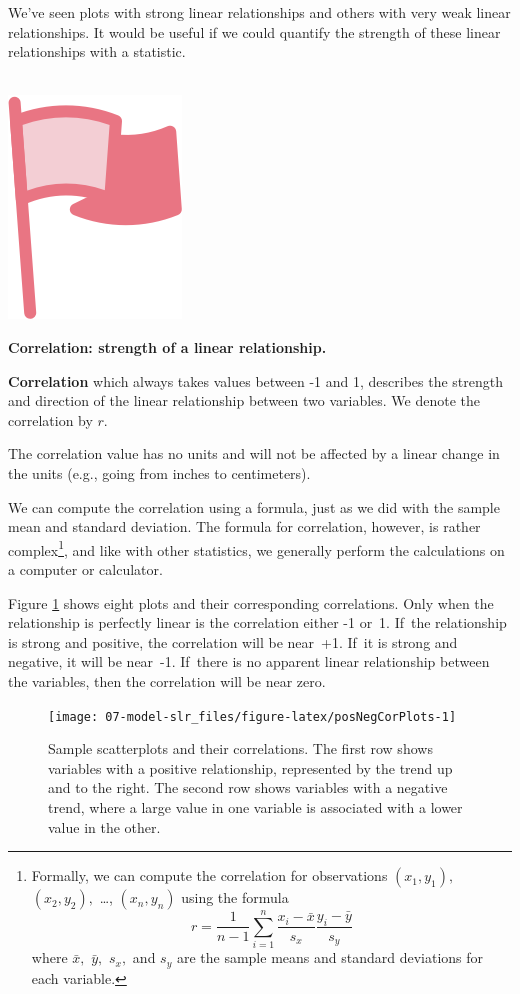 \documentclass[
  10pt,
  openany]{book}
\newenvironment{mdframedwithfootImportant}
{   
    \savenotes
    \begin{mdframed}[%
    topline=true, bottomline=true, linecolor=oiR, linewidth=0.5pt,
    rightline=false, leftline=false,
    backgroundcolor=oiLGray]
    \renewcommand{\thempfootnote}{\arabic{footnote}}
    }
{
    \end{mdframed}
    \spewnotes
}
\newenvironment{important}{
    \let\oldtextbf\textbf
    \renewcommand{\textbf}[1]{{\textcolor{oiR}{\oldtextbf{##1}}}}
\vspace{4mm}
\begin{mdframedwithfootImportant}
\begin{minipage}[t]{0.10\textwidth}
{$\:$ \\ \setkeys{Gin}{width=2.5em,keepaspectratio}\includegraphics{images/_icons/important.png}}
\end{minipage}
\hfill
\begin{minipage}[t]{0.90\textwidth}
\vspace{-2mm}
\setlength{\parskip}{1em}
}{\end{minipage}
\end{mdframedwithfootImportant}
\vspace{4mm}
}
\begin{document}
We've seen plots with strong linear relationships and others with very weak linear relationships.
It would be useful if we could quantify the strength of these linear relationships with a statistic.

\begin{important}
\textbf{Correlation: strength of a linear relationship.}

\textbf{Correlation} which always takes values between -1 and 1, describes the strength and direction of the linear relationship between two variables.
We denote the correlation by \(r.\)

The correlation value has no units and will not be affected by a linear change in the units (e.g., going from inches to centimeters).

\end{important}

We can compute the correlation using a formula, just as we did with the sample mean and standard deviation.
The formula for correlation, however, is rather complex\footnote{Formally, we can compute the correlation for observations \((x_1, y_1),\) \((x_2, y_2),\) \ldots, \((x_n, y_n)\) using the formula \[r = \frac{1}{n-1} \sum_{i=1}^{n} \frac{x_i-\bar{x}}{s_x}\frac{y_i-\bar{y}}{s_y}\] where \(\bar{x},\) \(\bar{y},\) \(s_x,\) and \(s_y\) are the sample means and standard deviations for each variable.}, and like with other statistics, we generally perform the calculations on a computer or calculator.

Figure \ref{fig:posNegCorPlots} shows eight plots and their corresponding correlations.
Only when the relationship is perfectly linear is the correlation either -1 or~1.
If~the relationship is strong and positive, the correlation will be near~+1.
If~it is strong and negative, it will be near~-1.
If~there is no apparent linear relationship between the variables, then the correlation will be near zero.

\begin{figure}[h]

{\centering \texttt{[image: 07-model-slr\_files/figure-latex/posNegCorPlots-1]} 

}

\caption{Sample scatterplots and their correlations. The first row shows variables with a positive relationship, represented by the trend up and to the right. The second row shows variables with a negative trend, where a large value in one variable is associated with a lower value in the other.}\label{fig:posNegCorPlots}
\end{figure}
\end{document}
